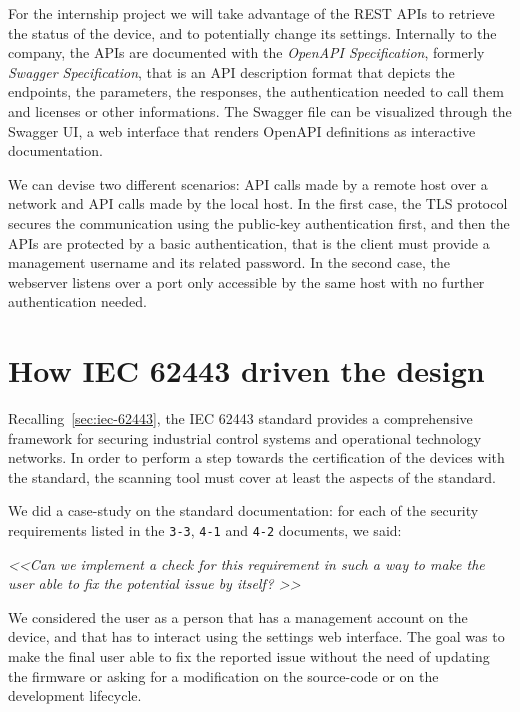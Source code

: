 For the internship project we will take advantage of the REST APIs to retrieve the status of the device, and to potentially change its settings. Internally to the company, the APIs are documented with the \textit{OpenAPI Specification}, formerly \textit{Swagger Specification}, that is an API description format that depicts the endpoints, the parameters, the responses, the authentication needed to call them and licenses or other informations. The Swagger file can be visualized through the Swagger UI, a web interface that renders OpenAPI definitions as interactive documentation.~\cite{openapi-swagger}

We can devise two different scenarios: API calls made by a remote host over a network and API calls made by the local host. In the first case, the TLS protocol secures the communication using the public-key authentication first, and then the APIs are protected by a basic authentication, that is the client must provide a management username and its related password. In the second case, the webserver listens over a port only accessible by the same host with no further authentication needed. 

\section{How IEC 62443 driven the design}

Recalling~\cref{sec:iec-62443}, the IEC 62443 standard provides a comprehensive framework for securing industrial control systems and operational technology networks. In order to perform a step towards the certification of the devices with the standard, the scanning tool must cover at least the aspects of the standard.

We did a case-study on the standard documentation: for each of the security requirements listed in the \texttt{3-3}, \texttt{4-1} and \texttt{4-2} documents, we said: 
\begin{mdframed}
  \textit{\textless\textless  Can we implement a check for this requirement in such a way to make the user able to fix the potential issue by itself? \textgreater\textgreater}
\end{mdframed}
We considered the user as a person that has a management account on the device, and that has to interact using the settings web interface. The goal was to make the final user able to fix the reported issue without the need of updating the firmware or asking for a modification on the source-code or on the development lifecycle.


